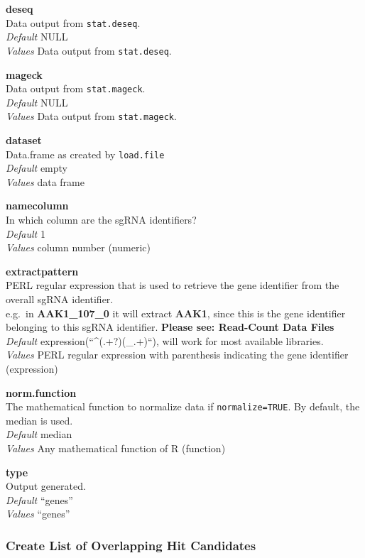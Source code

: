 \documentclass[]{article}
\begin{document}
\textbf{deseq}\\
Data output from \texttt{stat.deseq}.\\
\emph{Default} NULL\\
\emph{Values} Data output from \texttt{stat.deseq}.

\textbf{mageck}\\
Data output from \texttt{stat.mageck}.\\
\emph{Default} NULL\\
\emph{Values} Data output from \texttt{stat.mageck}.

\textbf{dataset}\\
Data.frame as created by \texttt{load.file}\\
\emph{Default} empty\\
\emph{Values} data frame

\textbf{namecolumn}\\
In which column are the sgRNA identifiers?\\
\emph{Default} 1\\
\emph{Values} column number (numeric)

\textbf{extractpattern}\\
PERL regular expression that is used to retrieve the gene identifier
from the overall sgRNA identifier.\\
e.g.~in \textbf{AAK1\_107\_0} it will extract \textbf{AAK1}, since this
is the gene identifier belonging to this sgRNA identifier.
\textbf{Please see: Read-Count Data Files}\\
\emph{Default} expression(``\^{}(.+?)(\_.+)``), will work for most
available libraries.\\
\emph{Values} PERL regular expression with parenthesis indicating the
gene identifier (expression)

\textbf{norm.function}\\
The mathematical function to normalize data if \texttt{normalize=TRUE}.
By default, the median is used.\\
\emph{Default} median\\
\emph{Values} Any mathematical function of R (function)

\textbf{type}\\
Output generated.\\
\emph{Default} ``genes''\\
\emph{Values} ``genes''

\subsubsection{Create List of Overlapping Hit
Candidates}\label{create-list-of-overlapping-hit-candidates}
\end{document}
